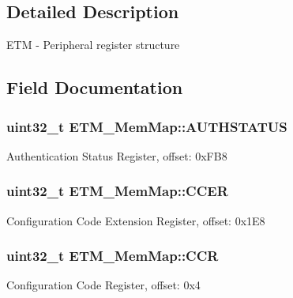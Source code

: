 \subsection{Detailed Description}
E\+T\+M -\/ Peripheral register structure 

\subsection{Field Documentation}
\hypertarget{struct_e_t_m___mem_map_a51a11fd9f2d1c734621098efd2b71493}{}
\subsubsection[{A\+U\+T\+H\+S\+T\+A\+T\+U\+S}]{\setlength{\rightskip}{0pt plus 5cm}uint32\+\_\+t E\+T\+M\+\_\+\+Mem\+Map\+::\+A\+U\+T\+H\+S\+T\+A\+T\+U\+S}\label{struct_e_t_m___mem_map_a51a11fd9f2d1c734621098efd2b71493}
Authentication Status Register, offset\+: 0x\+F\+B8 \hypertarget{struct_e_t_m___mem_map_a94aeaa48b0535d838c20834618b26f4a}{}
\subsubsection[{C\+C\+E\+R}]{\setlength{\rightskip}{0pt plus 5cm}uint32\+\_\+t E\+T\+M\+\_\+\+Mem\+Map\+::\+C\+C\+E\+R}\label{struct_e_t_m___mem_map_a94aeaa48b0535d838c20834618b26f4a}
Configuration Code Extension Register, offset\+: 0x1\+E8 \hypertarget{struct_e_t_m___mem_map_ae429b2d6bbe8b448eefc4e9a19ef6435}{}
\subsubsection[{C\+C\+R}]{\setlength{\rightskip}{0pt plus 5cm}uint32\+\_\+t E\+T\+M\+\_\+\+Mem\+Map\+::\+C\+C\+R}\label{struct_e_t_m___mem_map_ae429b2d6bbe8b448eefc4e9a19ef6435}
Configuration Code Register, offset\+: 0x4 \hypertarget{struct_e_t_m___mem_map_a289eea9e2103e42ed73809a60b78a83c}{}
